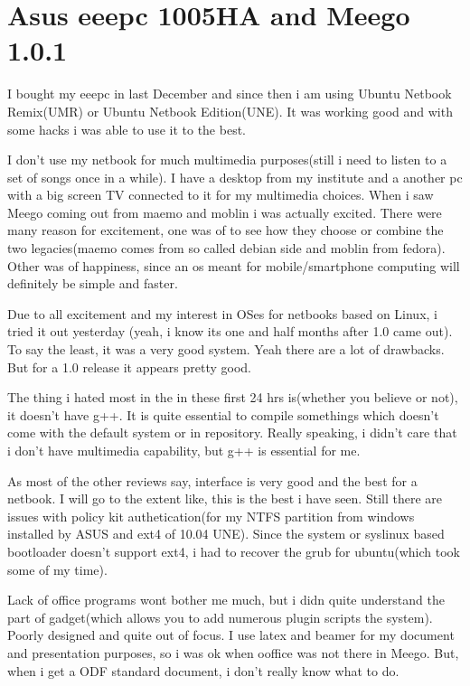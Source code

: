 \section*{Asus eeepc 1005HA and Meego 1.0.1}
\vskip 2pt

I bought my eeepc in last December and since then i am using Ubuntu Netbook Remix(UMR) or Ubuntu Netbook Edition(UNE). 
It was working good and with some hacks i was able to use it to the best.

I don't use my netbook for much multimedia purposes(still i need to listen to a set of songs once in a while). 
I have a desktop from my institute and a another pc with a big screen TV connected to it for my multimedia choices. 
When i saw Meego coming out from maemo and moblin i was actually excited. There were many reason for excitement, 
one was of to see how they choose or combine the two legacies(maemo comes from so called debian side and moblin from fedora).
Other was of happiness, since an os meant for mobile/smartphone computing will definitely be simple and faster.

Due to all excitement and my interest in OSes for netbooks based on Linux, i tried it out yesterday
(yeah, i know its one and half months after 1.0 came out). To say the least, it was a very good system. 
Yeah there are a lot of drawbacks. But for a 1.0 release it appears pretty good.

The thing i hated most in the in these first 24 hrs is(whether you believe or not), it doesn’t have g++. 
It is quite essential to compile somethings which doesn’t come with the default system or in repository. 
Really speaking, i didn’t care that i don’t have multimedia capability, but g++ is essential for me.

As most of the other reviews say, interface is very good and the best for a netbook. I will go to the extent like, 
this is the best i have seen. Still there are issues with policy kit authetication(for my NTFS partition from windows 
installed by ASUS and ext4 of 10.04 UNE). Since the system or syslinux based bootloader doesn’t support ext4, 
i had to recover the grub for ubuntu(which took some of my time).

Lack of office programs wont bother me much, but i didn quite understand the part of gadget(which allows you to add numerous 
plugin scripts the system). Poorly designed and quite out of focus. I use latex and beamer for my document and presentation 
purposes, so i was ok when ooffice was not there in Meego. But, when i get a ODF standard document, 
i don’t really know what to do.

